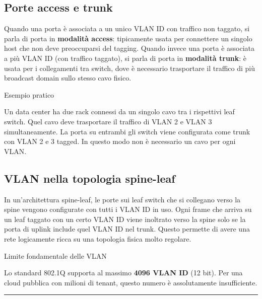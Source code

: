 \documentclass[
  italian,
  openany]{book}
\begin{document}
\subsection{Porte access e trunk}\label{porte-access-e-trunk}

Quando una porta è associata a un unico VLAN ID con traffico non
taggato, si parla di porta in \textbf{modalità access}: tipicamente
usata per connettere un singolo host che non deve preoccuparsi del
tagging. Quando invece una porta è associata a più VLAN ID (con traffico
taggato), si parla di porta in \textbf{modalità trunk}: è usata per i
collegamenti tra switch, dove è necessario trasportare il traffico di
più broadcast domain sullo stesso cavo fisico.

\begin{callouttip}{Esempio pratico}

Un data center ha due rack connessi da un singolo cavo tra i rispettivi
leaf switch. Quel cavo deve trasportare il traffico di VLAN 2 e VLAN 3
simultaneamente. La porta su entrambi gli switch viene configurata come
trunk con VLAN 2 e 3 tagged. In questo modo non è necessario un cavo per
ogni VLAN.

\end{callouttip}

\subsection{VLAN nella topologia
spine-leaf}\label{vlan-nella-topologia-spine-leaf}

In un'architettura spine-leaf, le porte sui leaf switch che si collegano
verso la spine vengono configurate con tutti i VLAN ID in uso. Ogni
frame che arriva su un leaf taggato con un certo VLAN ID viene inoltrato
verso la spine solo se la porta di uplink include quel VLAN ID nel
trunk. Questo permette di avere una rete logicamente ricca su una
topologia fisica molto regolare.

\begin{calloutwarning}{Limite fondamentale delle VLAN}

Lo standard 802.1Q supporta al massimo \textbf{4096 VLAN ID} (12 bit).
Per una cloud pubblica con milioni di tenant, questo numero è
assolutamente insufficiente.

\end{calloutwarning}

\begin{center}\rule{0.5\linewidth}{0.5pt}\end{center}
\end{document}
